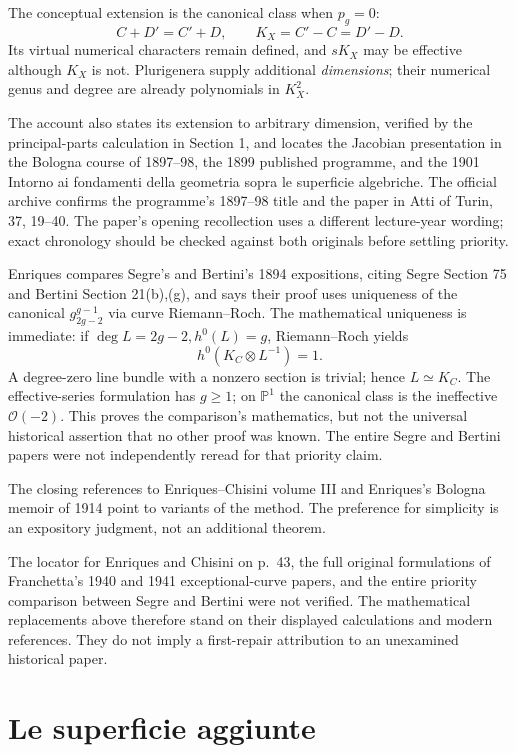 The conceptual extension is the canonical class when \(p_g=0\): \[
C+D'=C'+D,\qquad K_X=C'-C=D'-D.
\] Its virtual numerical characters remain defined, and \(sK_X\) may be effective although \(K_X\) is not. Plurigenera supply additional \emph{dimensions}; their numerical genus and degree are already polynomials in \(K_X^2\).

The account also states its extension to arbitrary dimension, verified by the principal-parts calculation in Section 1, and locates the Jacobian presentation in the Bologna course of 1897--98, the 1899 published programme, and the 1901 Intorno ai fondamenti della geometria sopra le superficie algebriche. The official archive confirms the programme's 1897--98 title and the paper in Atti of Turin, 37, 19--40. The paper's opening recollection uses a different lecture-year wording; exact chronology should be checked against both originals before settling priority.

Enriques compares Segre's and Bertini's 1894 expositions, citing Segre Section 75 and Bertini Section 21(b),(g), and says their proof uses uniqueness of the canonical \(g_{2g-2}^{g-1}\) via curve Riemann--Roch. The mathematical uniqueness is immediate: if \(\deg L=2g-2,h^0(L)=g\), Riemann--Roch yields \[
h^0(K_C\otimes L^{-1})=1.
\] A degree-zero line bundle with a nonzero section is trivial; hence \(L\simeq K_C\). The effective-series formulation has \(g\ge1\); on \(\mathbb{P}^1\) the canonical class is the ineffective \(\mathcal O(-2)\). This proves the comparison's mathematics, but not the universal historical assertion that no other proof was known. The entire Segre and Bertini papers were not independently reread for that priority claim.

The closing references to Enriques--Chisini volume III and Enriques's Bologna memoir of 1914 point to variants of the method. The preference for simplicity is an expository judgment, not an additional theorem.

The locator for Enriques and Chisini on p.~43, the full original formulations of Franchetta's 1940 and 1941 exceptional-curve papers, and the entire priority comparison between Segre and Bertini were not verified. The mathematical replacements above therefore stand on their displayed calculations and modern references. They do not imply a first-repair attribution to an unexamined historical paper.

\chapter{Le superficie aggiunte}

